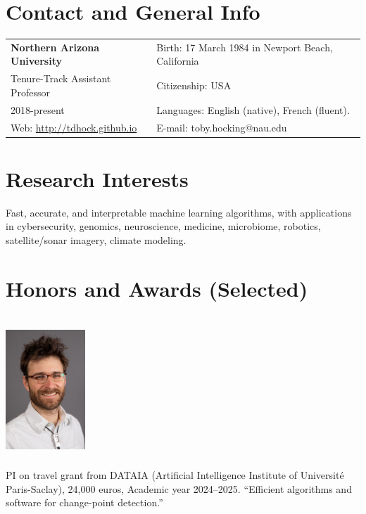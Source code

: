\documentclass[margin,line]{res}
\begin{document}

\begin{resume}
\section{\sc Contact and General Info}
\vspace{.05in}
\begin{tabular*}{6.1in} {@{\extracolsep{\fill}}ll}
  {\bf Northern Arizona University}& Birth: 17 March 1984 in Newport Beach, California\\
  Tenure-Track Assistant Professor  & Citizenship: USA \\
   2018-present
 & Languages: English (native), French (fluent).\\
  Web: \url{http://tdhock.github.io} &   E-mail:  toby.hocking@nau.edu \\
\end{tabular*}

\section{\sc Research Interests}

Fast, accurate, and interpretable machine learning algorithms, with
applications in cybersecurity, genomics, neuroscience, medicine,
microbiome, robotics, satellite/sonar imagery,
climate modeling.


\section{\sc Honors and Awards (Selected) \\ \hspace{0.1cm} \\ \includegraphics[width=3cm]{HOCKING-rectangle-lores.jpg}}

PI on travel grant from DATAIA (Artificial Intelligence Institute of
Université Paris-Saclay), 24,000 euros, Academic year
2024--2025. ``Efficient algorithms and software for change-point
detection.''


\end{resume}
\end{document}
